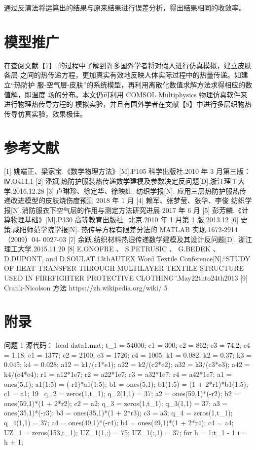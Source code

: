 \documentclass{article}
\begin{document}
	通过反演法将运算出的结果与原来结果进行误差分析，得出结果相同的收敛率。
	\section{模型推广}
	在查阅文献【7】
	的过程中了解到许多国外学者将对假人进行仿真模拟，建立皮肤各层
	之间的热传递方程，更加真实有效地反映人体实际过程中的热量传递。如建立“热防护
	服‐空气层‐皮肤”的系统模型，再利用离散化数值求解方法求得相应的数值解，即温度
	场的分布。本文仍可利用 COMSOL Multiphysics 物理仿真软件来进行物理热传导方程的
	模拟实验，并且有国外学者在文献【8】中进行多层织物热传导仿真实验，效果极佳。
	\section{参考文献}
	[1] 姚端正、梁家宝.《数学物理方法》[M].P105 科学出版社.2010 年 3 月第三版：Ⅳ.O411.1 
	[2] 潘斌.热防护服装热传递数学建模及参数决定反问题[D].浙江理工大学.2016.12.28 
	[3] 卢琳珍、徐定华、徐映红. 纺织学报[N]. 应用三层热防护服热传递改进模型的皮肤烧伤度预测 
	2018 年 1 月 
	[4] 赖军、张梦莹、张华、李俊 纺织学报[N].消防服衣下空气层的作用与测定方法研究进展 2017
	年 6 月 
	[5] 彭芳麟.《计算物理基础》[M].P330 高等教育出版社·北京.2010 年 1 月第 1 版.2013.12 
	[6] 史策.咸阳师范学院学报[N]. 热传导方程有限差分法的 MATLAB 实现.1672-2914（2009）04-
	0027-03 
	[7] 余跃.纺织材料热湿传递数学建模及其设计反问题[D]. 浙江理工大学.2015.11.20 
	[8] E.ONOFRE 、 S.PETRUSIC 、 G.BEDEK 、 D.DUPONT, and D.SOULAT.13thAUTEX Word Textile 
	Conference[N].“STUDY OF HEAT TRANSFER THROUGH MULTILAYER TEXTILE STRUCTURE USED IN 
	FIREFIGHTER PROTECTIVE CLOTHING”.May22thto24th2013 
	[9] Crank-Nicolson 方法 
	https://zh.wikipedia.org/wiki/%
	5%
	\section{附录}
	
	问题 1 源代码： 
	load data1.mat; 
	t_1 = 54000; 
	e1 = 300; 
	e2 = 862; 
	e3 = 74.2; 
	e4 = 1.18; 
	c1 = 1377; 
	c2 = 2100; 
	c3 = 1726; 
	c4 = 1005; 
	k1 = 0.082; 
	k2 = 0.37; 
	k3 = 0.045; 
	k4 = 0.028; 
	a12 = k1/(c1*e1); 
	a22 = k2/(c2*e2); 
	a32 = k3/(c3*e3); 
	a42 = k4/(c4*e4); 
	r1 = a12*1e7; 
	r2 = a22*1e7; 
	r3 = a32*1e7; 
	r4 = a42*1e7; 
	a1 = ones(5,1); 
	a1(1:5) = (-r1)*a1(1:5); 
	b1 = ones(5,1); 
	b1(1:5) = (1 + 2*r1)*b1(1:5); 
	c1 = a1; 
	19 
	q_2 = zeros(1,t_1); 
	q_2(1,1) = 37; 
	a2 = ones(59,1)*(-r2); 
	b2 = ones(59,1)*(1 + 2*r2); 
	c2 = a2; 
	q_3 = zeros(1,t_1); 
	q_3(1,1) = 37; 
	a3 = ones(35,1)*(-r3); 
	b3 = ones(35,1)*(1 + 2*r3); 
	c3 = a3; 
	q_4 = zeros(1,t_1); 
	q_4(1,1) = 37; 
	a4 = ones(49,1)*(-r4); 
	b4 = ones(49,1)*(1 + 2*r4); 
	c4 = a4; 
	UZ_1 = zeros(153,t_1); 
	UZ_1(1,:) = 75;%
	UZ_1(:,1) = 37; 
	for h = 1:t_1 - 1 
	i = h + 1; 
	
\end{document}
